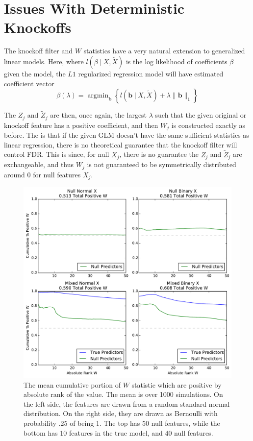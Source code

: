 \documentclass[11pt]{article}
\newcommand{\st}{ \; \big | \:}
\theoremstyle{definition}
\DeclareMathOperator*{\argmin}{arg\min}
\begin{document}
\section{Issues With Deterministic Knockoffs} 
    The knockoff filter and $W$ statistics have a very natural extension to generalized linear models. Here, where $l(\beta\st X, \tilde X)$ is the log likelihood of coefficients $\beta$ given the model, the $L1$ regularized regression model will have estimated coefficient vector
    \[ \beta(\lambda) = \argmin_\mathbf b \left\{l(\mathbf{b}\st X, \tilde X) + \lambda\|\mathbf{b}\|_1 \right\}\]

    The $Z_j$ and $\tilde Z_j$ are then, once again, the largest $\lambda$ such that the given original or knockoff feature has a positive coefficient, and then $W_j$ is constructed exactly as before. The is that if the given GLM doesn't have the same sufficient statistics as linear regression, there is no theoretical guarantee that the knockoff filter will control FDR. This is since, for null $X_j$, there is no guarantee the $Z_j$ and $\tilde Z_j$ are exchangeable, and thus $W_j$ is not guaranteed to be symmetrically distributed around $0$ for null features $X_j$. \par
    \begin{figure}[h]
        \begin{center}
        \includegraphics[width=14cm]{images/entryrate_original_logit}
    \end{center}
    \caption{\linespread{1}\selectfont{} The mean cumulative portion of $W$ statistic which are positive by absolute rank of the value. The mean is over 1000 simulations. On the left side, the features are drawn from a random standard normal distribution. On the right side, they are drawn as Bernoulli with probability $.25$ of being 1. The top has 50 null features, while the bottom has 10 features in the true model, and 40 null features.}
    \end{figure}
 
\end{document}

